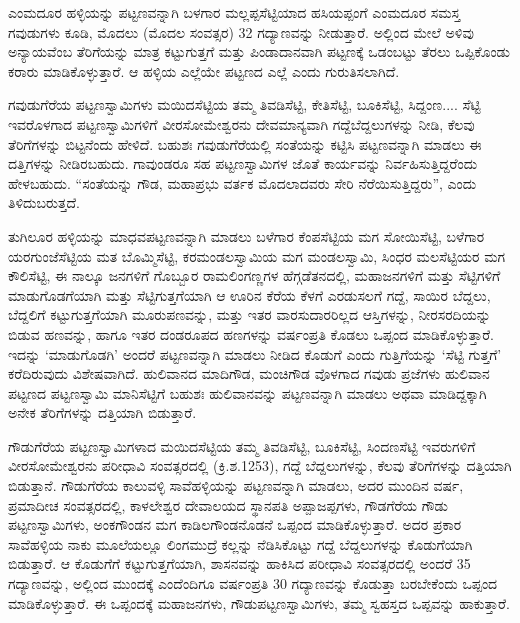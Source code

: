 ಎಂಮದೂರ ಹಳ್ಳಿಯನ್ನು ಪಟ್ಟಣವನ್ನಾಗಿ ಬಳಗಾರ ಮಲ್ಲಪ್ಪಸೆಟ್ಟಿಯಾದ ಹಸಿಯಪ್ಪಂಗೆ ಎಂಮದೂರ ಸಮಸ್ತ ಗವುಡುಗಳು ಕೂಡಿ, ಮೊದಲು (ಮೊದಲ ಸಂವತ್ಸರ) 32 ಗದ್ಯಾಣವನ್ನು ನೀಡುತ್ತಾರೆ. ಅಲ್ಲಿಂದ ಮೇಲೆ ಅಳಿವು ಅನ್ಯಾಯವೆಂಬ ತೆರಿಗೆಯನ್ನು ಮಾತ್ರ ಕಟ್ಟುಗುತ್ತಗೆ ಮತ್ತು ಪಿಂಡಾದಾನವಾಗಿ ಪಟ್ಟಣಕ್ಕೆ ಒಡಂಬಟ್ಟು ತೆರಲು ಒಪ್ಪಿಕೊಂಡು ಕರಾರು ಮಾಡಿಕೊಳ್ಳುತ್ತಾರೆ. ಆ ಹಳ್ಳಿಯ ಎಲ್ಲೆಯೇ ಪಟ್ಟಣದ ಎಲ್ಲೆ ಎಂದು ಗುರುತಿಸಲಾಗಿದೆ.

ಗವುಡುಗೆರೆಯ ಪಟ್ಟಣಸ್ವಾಮಿಗಳು ಮಯಿದಸೆಟ್ಟಿಯ ತಮ್ಮ ತಿವಡಿಸೆಟ್ಟಿ, ಕೇತಿಸೆಟ್ಟಿ, ಬೂಕಿಸೆಟ್ಟಿ, ಸಿದ್ದಂಣ.... ಸೆಟ್ಟಿ ಇವರೊಳಗಾದ ಪಟ್ಟಣಸ್ವಾಮಿಗಳಿಗೆ ವೀರಸೋಮೇಶ್ವರನು ದೇವಮಾನ್ಯವಾಗಿ ಗದ್ದೆಬೆದ್ದಲುಗಳನ್ನು ನೀಡಿ, ಕೆಲವು ತೆರಿಗೆಗಳನ್ನು ಬಿಟ್ಟನೆಂದು ಹೇಳಿದೆ. ಬಹುಶಃ ಗವುಡುಗೆರೆಯಲ್ಲಿ ಸಂತೆಯನ್ನು ಕಟ್ಟಿಸಿ ಪಟ್ಟಣವನ್ನಾಗಿ ಮಾಡಲು ಈ ದತ್ತಿಗಳನ್ನು ನೀಡಿರಬಹುದು. ಗಾವುಂಡರೂ ಸಹ ಪಟ್ಟಣಸ್ವಾಮಿಗಳ ಜೊತೆ ಕಾರ್ಯವನ್ನು ನಿರ್ವಹಿಸುತ್ತಿದ್ದರೆಂದು ಹೇಳಬಹುದು. “ಸಂತೆಯನ್ನು ಗೌಡ, ಮಹಾಪ್ರಭು ವರ್ತಕ ಮೊದಲಾದವರು ಸೇರಿ ನೆರೆಯಿಸುತ್ತಿದ್ದರು”, ಎಂದು ತಿಳಿದುಬರುತ್ತದೆ.

ತುಗಿಲೂರ ಹಳ್ಳಿಯನ್ನು ಮಾಧವಪಟ್ಟಣವನ್ನಾಗಿ ಮಾಡಲು ಬಳೆಗಾರ ಕೆಂಪಸೆಟ್ಟಿಯ ಮಗ ಸೋಯಿಸೆಟ್ಟಿ, ಬಳೆಗಾರ ಯರಗುಂಜೆಸೆಟ್ಟಿಯ ಮತ ಬೊಮ್ಮಿಸೆಟ್ಟಿ, ಕರಮಂಡಲಸ್ವಾಮಿಯ ಮಗ ಮಂಡಲಸ್ವಾಮಿ, ಸಿಂಧರ ಮಲಸೆಟ್ಟಿಯರ ಮಗ ಕೌಲಿಸೆಟ್ಟಿ, ಈ ನಾಲ್ಕೂ ಜನಗಳಿಗೆ ಗೊಬ್ಬೂರ ರಾಮಲಿಂಗಣ್ಣಗಳ ಹೆಗ್ಗಡೆತನದಲ್ಲಿ, ಮಹಾಜನಗಳಿಗೆ ಮತ್ತು ಸೆಟ್ಟಿಗಳಿಗೆ ಮಾಡುಗೊಡಗೆಯಾಗಿ ಮತ್ತು ಸೆಟ್ಟಿಗುತ್ತಗೆಯಾಗಿ ಆ ಊರಿನ ಕೆರೆಯ ಕೆಳಗೆ ಎರಡುಸಲಗೆ ಗದ್ದೆ, ಸಾಯಿರ ಬೆದ್ದಲು, ಬೆದ್ದಲಿಗೆ ಕಟ್ಟುಗುತ್ತಗೆಯಾಗಿ ಮೂರುಪಣವನ್ನು, ಮತ್ತು ಇತರ ವಾರಸುದಾರರಿಲ್ಲದ ಆಸ್ತಿಗಳನ್ನು, ನೀರಸರದಿಯನ್ನು ಬಿಡುವ ಹಣವನ್ನು, ಹಾಗೂ ಇತರ ದಂಡರೂಪದ ಹಣಗಳನ್ನು ವರ್ಷಂಪ್ರತಿ ಕೊಡಲು ಒಪ್ಪಂದ ಮಾಡಿಕೊಳ್ಳುತ್ತಾರೆ. ಇದನ್ನು ‘ಮಾಡುಗೊಡಗಿ’ ಅಂದರೆ ಪಟ್ಟಣವನ್ನಾಗಿ ಮಾಡಲು ನೀಡಿದ ಕೊಡುಗೆ ಎಂದು ಗುತ್ತಿಗೆಯನ್ನು ‘ಸೆಟ್ಟಿ ಗುತ್ತಗೆ’ ಕರೆದಿರುವುದು ವಿಶೇಷವಾಗಿದೆ. ಹುಲಿವಾನದ ಮಾದಿಗೌಡ, ಮಂಚಿಗೌಡ ವೊಳಗಾದ ಗವುಡು ಪ್ರಜೆಗಳು ಹುಲಿವಾನ ಪಟ್ಟಣದ ಪಟ್ಟಣಸ್ವಾಮಿ ಮಾನಿಸೆಟ್ಟಿಗೆ ಬಹುಶಃ ಹುಲಿವಾನವನ್ನು ಪಟ್ಟಣವನ್ನಾಗಿ ಮಾಡಲು ಅಥವಾ ಮಾಡಿದ್ದಕ್ಕಾಗಿ ಅನೇಕ ತೆರಿಗೆಗಳನ್ನು ದತ್ತಿಯಾಗಿ ಬಿಡುತ್ತಾರೆ.

ಗೌಡುಗೆರೆಯ ಪಟ್ಟಣಸ್ವಾಮಿಗಳಾದ ಮಯಿದಸೆಟ್ಟಿಯ ತಮ್ಮ ತಿವಡಿಸೆಟ್ಟಿ, ಬೂಕಿಸೆಟ್ಟಿ, ಸಿಂದಣಸೆಟ್ಟಿ ಇವರುಗಳಿಗೆ ವೀರಸೋಮೇಶ್ವರನು ಪರೀಧಾವಿ ಸಂವತ್ಸರದಲ್ಲಿ (ಕ್ರಿ.ಶ.1253), ಗದ್ದೆ ಬೆದ್ದಲುಗಳನ್ನು, ಕೆಲವು ತೆರಿಗೆಗಳನ್ನು ದತ್ತಿಯಾಗಿ ಬಿಡುತ್ತಾನೆ. ಗೌಡುಗೆರೆಯ ಕಾಲುವಳ್ಳಿ ಸಾವೆಹಳ್ಳಿಯನ್ನು ಪಟ್ಟಣವನ್ನಾಗಿ ಮಾಡಲು, ಅದರ ಮುಂದಿನ ವರ್ಷ, ಪ್ರಮಾದೀಚ ಸಂವತ್ಸರದಲ್ಲಿ, ಕಾಳಲೇಶ್ವರ ದೇವಾಲಯದ ಸ್ಥಾನಪತಿ ಅಪ್ಪಾಜಪ್ಪಗಳು, ಗೌಡಗೆರೆಯ ಗೌಡು ಪಟ್ಟಣಸ್ವಾಮಿಗಳು, ಅಂಕಗೌಂಡನ ಮಗ ಕಾಡಿಲಗೌಂಡನೊಡನೆ ಒಪ್ಪಂದ ಮಾಡಿಕೊಳ್ಳುತ್ತಾರೆ. ಅದರ ಪ್ರಕಾರ ಸಾವೆಹಳ್ಳಿಯ ನಾಕು ಮೂಲೆಯಲ್ಲೂ ಲಿಂಗಮುದ್ರೆ ಕಲ್ಲನ್ನು ನೆಡಿಸಿಕೊಟ್ಟು ಗದ್ದೆ ಬೆದ್ದಲುಗಳನ್ನು ಕೊಡುಗೆಯಾಗಿ ಬಿಡುತ್ತಾರೆ. ಆ ಕೊಡುಗೆಗೆ ಕಟ್ಟುಗುತ್ತಗೆಯಾಗಿ, ಶಾಸನವನ್ನು ಹಾಕಿಸಿದ ಪರೀಧಾವಿ ಸಂವತ್ಸರದಲ್ಲಿ ಅಂದರೆ 35 ಗದ್ಯಾಣವನ್ನು, ಅಲ್ಲಿಂದ ಮುಂದಕ್ಕೆ ಎಂದೆಂದಿಗೂ ವರ್ಷಂಪ್ರತಿ 30 ಗದ್ಯಾಣವನ್ನು ಕೊಡುತ್ತಾ ಬರಬೇಕೆಂದು ಒಪ್ಪಂದ ಮಾಡಿಕೊಳ್ಳುತ್ತಾರೆ. ಈ ಒಪ್ಪಂದಕ್ಕೆ ಮಹಾಜನಗಳು, ಗೌಡುಪಟ್ಟಣಸ್ವಾಮಿಗಳು, ತಮ್ಮ ಸ್ವಹಸ್ತದ ಒಪ್ಪವನ್ನು ಹಾಕುತ್ತಾರೆ.

